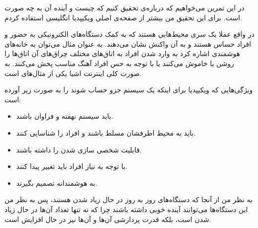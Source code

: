 \documentclass[]{article}
\begin{document}
\printheader
در این تمرین می‌خواهیم که درباره‌ی
تحقیق کنیم که چیست و آینده آن به چه صورت است. برای این تحقیق من بیشتر از صفحه‌ی اصلی ویکیپدیا انگلیسی استفاده کردم.

در واقع
عملا یک سری محیط‌هایی هستند که به کمک دستگاه‌های الکترونیکی به حضور و افراد حساس هستند و به آن واکنش نشان می‌دهند.
به عنوان مثال می‌توان به خانه‌های هوشمندی اشاره کرد به وارد شدن افراد به اتاق‌های مختلف چراق‌های آن
اتاق‌ها را روشن یا خاموش می‌کنند یا با توجه به حس افراد آهنگ مناسب پخش می‌کنند. به صورت کلی اینترنت اشیا یکی از مثال‌های
است.

ویژگی‌هایی که ویکیپدیا برای اینکه یک سیستم جزو
حساب شوند را به صورت زیر آورده است:
\begin{itemize}
    \item باید سیستم نهفته و فراوان باشند.
    \item باید به محیط اطرفشان مسلط باشند و افراد را شناسایی کنند.
    \item قابلیت شخصی سازی شدن را داشته باشند.
    \item با توجه به نیاز افراد باید تغییر پیدا کنند.
    \item به هوشمندانه تصمیم بگیرند.
\end{itemize}

به نظر من از آنجا که دستگاه‌های
روز به روز در حال زیاد شدن هستند، پس به نظر من این دستگاه‌ها می‌توانند آینده خوبی داشته باشند چرا که نه تنها تعداد
آن‌ها در حال زیاد شدن است، بلکه قدرت پردازشی آن‌ها و
آن‌ها نیز در حال افزایش است.
\end{document}
